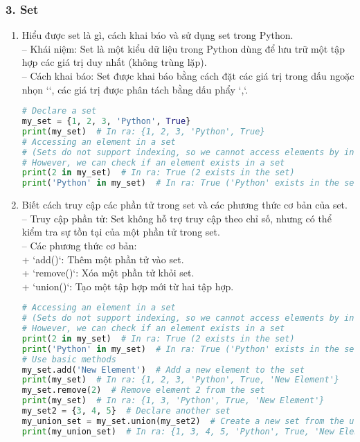 \subsubsection*{3. Set}
\begin{enumerate}[label=\alph*.]
    \item Hiểu được set là gì, cách khai báo và sử dụng set trong Python.\\
    -- Khái niệm: Set là một kiểu dữ liệu trong Python dùng để lưu trữ một tập hợp các giá trị duy nhất (không trùng lặp).\\
    -- Cách khai báo: Set được khai báo bằng cách đặt các giá trị trong dấu ngoặc nhọn `{}`, các giá trị được phân tách bằng dấu phẩy `,`.
    \begin{lstlisting}[language=Python]
# Declare a set
my_set = {1, 2, 3, 'Python', True}
print(my_set)  # In ra: {1, 2, 3, 'Python', True}
# Accessing an element in a set
# (Sets do not support indexing, so we cannot access elements by index)
# However, we can check if an element exists in a set
print(2 in my_set)  # In ra: True (2 exists in the set)
print('Python' in my_set)  # In ra: True ('Python' exists in the set)
    \end{lstlisting}
    \vspace{-4.5em}
    \item Biết cách truy cập các phần tử trong set và các phương thức cơ bản của set.\\
    -- Truy cập phần tử: Set không hỗ trợ truy cập theo chỉ số, nhưng có thể kiểm tra sự tồn tại của một phần tử trong set.\\
    -- Các phương thức cơ bản:\\
        + `add()`: Thêm một phần tử vào set.\\
        + `remove()`: Xóa một phần tử khỏi set.\\
        + `union()`: Tạo một tập hợp mới từ hai tập hợp.
    \begin{lstlisting}[language=Python]
# Accessing an element in a set
# (Sets do not support indexing, so we cannot access elements by index)
# However, we can check if an element exists in a set
print(2 in my_set)  # In ra: True (2 exists in the set)
print('Python' in my_set)  # In ra: True ('Python' exists in the set)
# Use basic methods
my_set.add('New Element')  # Add a new element to the set
print(my_set)  # In ra: {1, 2, 3, 'Python', True, 'New Element'}
my_set.remove(2)  # Remove element 2 from the set
print(my_set)  # In ra: {1, 3, 'Python', True, 'New Element'}
my_set2 = {3, 4, 5}  # Declare another set
my_union_set = my_set.union(my_set2)  # Create a new set from the union of two sets
print(my_union_set)  # In ra: {1, 3, 4, 5, 'Python', True, 'New Element'}
    \end{lstlisting}
\end{enumerate}
\vspace*{-6.5em}
